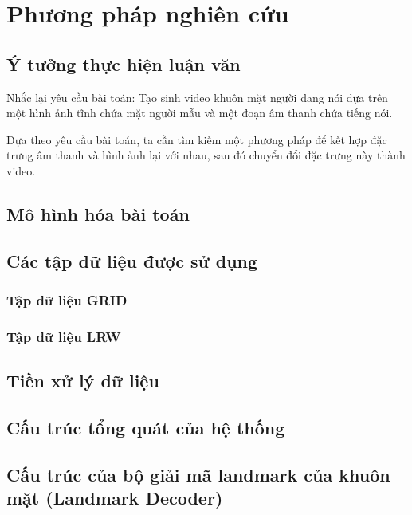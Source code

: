 \section{\texorpdfstring{Phương pháp nghiên cứu}{methodology}}

\subsection{Ý tưởng thực hiện luận văn}

Nhắc lại yêu cầu bài toán: Tạo sinh video khuôn mặt người đang nói dựa trên một hình ảnh tĩnh chứa mặt người mẫu và một đoạn âm thanh chứa tiếng nói.

Dựa theo yêu cầu bài toán, ta cần tìm kiếm một phương pháp để kết hợp đặc trưng âm thanh và hình ảnh lại với nhau, sau đó chuyển đổi đặc trưng này thành video.

\subsection{Mô hình hóa bài toán}

\subsection{Các tập dữ liệu được sử dụng}
\subsubsection{Tập dữ liệu GRID \cite{grid}}
\subsubsection{Tập dữ liệu LRW \cite{lrw}}

\subsection{Tiền xử lý dữ liệu}

\subsection{Cấu trúc tổng quát của hệ thống}

\subsection{Cấu trúc của bộ giải mã landmark của khuôn mặt (Landmark Decoder)}

